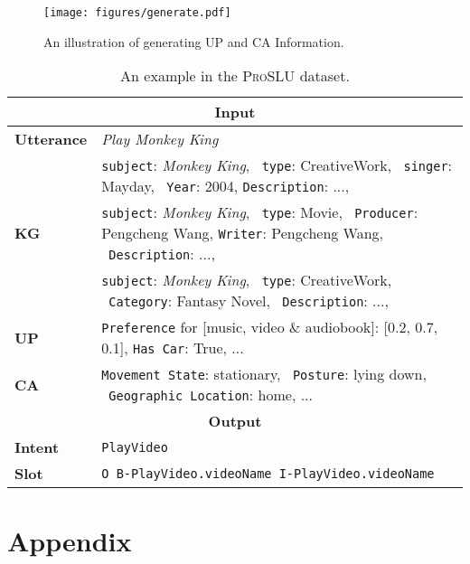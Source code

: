 \documentclass[letterpaper]{article} \usepackage{aaai22}  \usepackage{times}  \usepackage{helvet}  \usepackage{courier}  \usepackage[hyphens]{url}  \usepackage{graphicx} \urlstyle{rm} \def\UrlFont{\rm}  \usepackage{natbib}  \usepackage{caption} \DeclareCaptionStyle{ruled}{labelfont=normalfont,labelsep=colon,strut=off} \frenchspacing  \setlength{\pdfpagewidth}{8.5in}  \setlength{\pdfpageheight}{11in}  \usepackage{algorithm}
\begin{document}
\begin{figure*}[t]
    \centering
    \texttt{[image: figures/generate.pdf]}
    \caption{
        An illustration of generating UP and CA Information.
    }
    \label{fig:generate}
\end{figure*}

\begin{table*}[t]
    \centering
    \begin{adjustbox}{width=0.9\textwidth}
        \begin{tabular}{l|l}
        \hline \hline 
        \multicolumn{2}{c}{\textbf{Input}} \\ \hline
        \textbf{Utterance} & \textit{Play Monkey King} \\ \hline
        \multirow{3}{*}{\textbf{KG}} & 
        \texttt{subject}: \textit{Monkey King}, \ \texttt{type}: CreativeWork, \ \texttt{singer}: Mayday, \ \texttt{Year}: 2004, \texttt{Description}: ..., \\ 
        & \texttt{subject}: \textit{Monkey King}, \ \texttt{type}: Movie, \ \texttt{Producer}: Pengcheng Wang, \texttt{Writer}: Pengcheng Wang, \ \texttt{Description}: ...,  \\ 
        & \texttt{subject}: \textit{Monkey King}, \ \texttt{type}: CreativeWork, \ \texttt{Category}: Fantasy Novel, \ \texttt{Description}: ..., \\ \hline
        \textbf{UP} & \texttt{Preference} for [music, video \& audiobook]: {[}0.2, 0.7, 0.1{]}, \texttt{Has Car}: True, ... \\ \hline
        \textbf{CA} & \texttt{Movement State}: stationary, \ \texttt{Posture}: lying down, \ \texttt{Geographic Location}: home, ... \\ \hline
        \multicolumn{2}{c}{\textbf{Output}} \\ \hline
        \textbf{Intent}    & \texttt{PlayVideo} \\ \hline
        \textbf{Slot}      & \texttt{O B-PlayVideo.videoName I-PlayVideo.videoName} \\ \hline
        \hline
        \end{tabular}
    \end{adjustbox}
    \caption{
        An example in the \textsc{ProSLU} dataset.
    }
    \label{tab:example}
\end{table*}

\section{Appendix}
\end{document}
